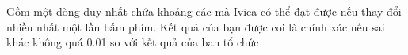 Gồm một dòng duy nhất chứa khoảng các mà Ivica có thể đạt được nếu thay đổi nhiều nhất một lần bấm phím. Kết quả của bạn được coi là chính xác nếu sai khác không quá 0.01 so với kết quả của ban tổ chức
